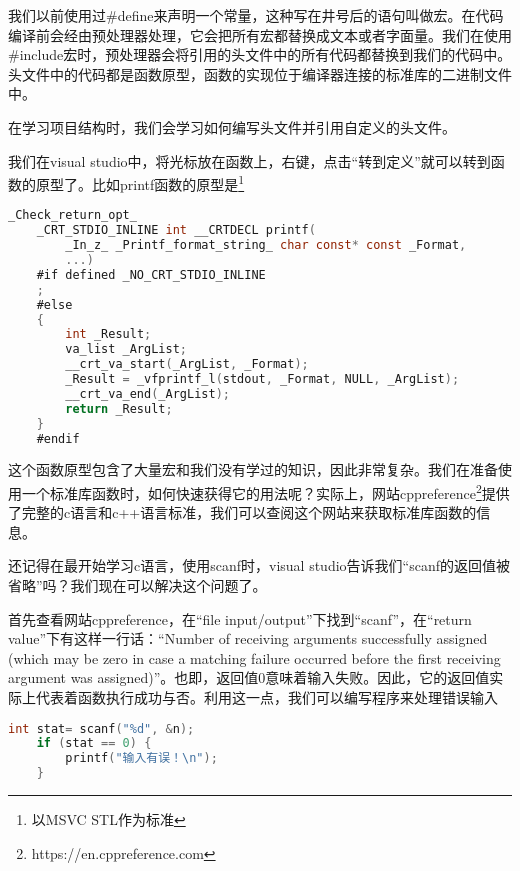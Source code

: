 我们以前使用过\#define来声明一个常量，这种写在井号后的语句叫做宏。在代码编译前会经由预处理器处理，它会把所有宏都替换成文本或者字面量。我们在使用\#include宏时，预处理器会将引用的头文件中的所有代码都替换到我们的代码中。头文件中的代码都是函数原型，函数的实现位于编译器连接的标准库的二进制文件中。

在学习项目结构时，我们会学习如何编写头文件并引用自定义的头文件。

我们在visual studio中，将光标放在函数上，右键，点击“转到定义”就可以转到函数的原型了。比如printf函数的原型是\footnote{以MSVC STL作为标准}

\begin{lstlisting}[language=C]
    _Check_return_opt_
    _CRT_STDIO_INLINE int __CRTDECL printf(
        _In_z_ _Printf_format_string_ char const* const _Format,
        ...)
    #if defined _NO_CRT_STDIO_INLINE
    ;
    #else
    {
        int _Result;
        va_list _ArgList;
        __crt_va_start(_ArgList, _Format);
        _Result = _vfprintf_l(stdout, _Format, NULL, _ArgList);
        __crt_va_end(_ArgList);
        return _Result;
    }
    #endif
\end{lstlisting}

这个函数原型包含了大量宏和我们没有学过的知识，因此非常复杂。我们在准备使用一个标准库函数时，如何快速获得它的用法呢？实际上，网站cppreference\footnote{https://en.cppreference.com}提供了完整的c语言和c++语言标准，我们可以查阅这个网站来获取标准库函数的信息。

还记得在最开始学习c语言，使用scanf时，visual studio告诉我们“scanf的返回值被省略”吗？我们现在可以解决这个问题了。

首先查看网站cppreference，在“file input/output”下找到“scanf”，在“return value”下有这样一行话：“Number of receiving arguments successfully assigned (which may be zero in case a matching failure occurred before the first receiving argument was assigned)”。也即，返回值0意味着输入失败。因此，它的返回值实际上代表着函数执行成功与否。利用这一点，我们可以编写程序来处理错误输入

\begin{lstlisting}[language=C]
    int stat= scanf("%d", &n);
    if (stat == 0) {
        printf("输入有误！\n");
    }
\end{lstlisting}
